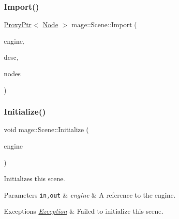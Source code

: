 \mbox{\label{classmage_1_1_scene_ac3ac7fd6eb1e6f59626b65f3da8553a4}} 
\subsubsection{\texorpdfstring{Import()}{Import()}\hspace{0.1cm}{\footnotesize\ttfamily [2/2]}}
{\footnotesize\ttfamily \mbox{\hyperlink{classmage_1_1_proxy_ptr}{Proxy\+Ptr}}$<$ \mbox{\hyperlink{classmage_1_1_node}{Node}} $>$ mage\+::\+Scene\+::\+Import (\begin{DoxyParamCaption}\item[{\mbox{\hyperlink{classmage_1_1_engine}{Engine}} \&}]{engine,  }\item[{const \mbox{\hyperlink{classmage_1_1rendering_1_1_model_descriptor}{rendering\+::\+Model\+Descriptor}} \&}]{desc,  }\item[{std\+::vector$<$ \mbox{\hyperlink{classmage_1_1_proxy_ptr}{Proxy\+Ptr}}$<$ \mbox{\hyperlink{classmage_1_1_node}{Node}} $>$ $>$ \&}]{nodes }\end{DoxyParamCaption})}

\mbox{\label{classmage_1_1_scene_a0edb77d5e45bd1822793d189a45fbb5c}} 
\subsubsection{\texorpdfstring{Initialize()}{Initialize()}}
{\footnotesize\ttfamily void mage\+::\+Scene\+::\+Initialize (\begin{DoxyParamCaption}\item[{\mbox{\hyperlink{classmage_1_1_engine}{Engine}} \&}]{engine }\end{DoxyParamCaption})}

Initializes this scene.


\begin{DoxyParams}[1]{Parameters}
\mbox{\tt in,out}  & {\em engine} & A reference to the engine. \\
\hline
\end{DoxyParams}

\begin{DoxyExceptions}{Exceptions}
{\em \mbox{\hyperlink{classmage_1_1_exception}{Exception}}} & Failed to initialize this scene. \\
\hline
\end{DoxyExceptions}
\mbox{\label{classmage_1_1_scene_a02ec2f7b43fd7050bc41eb7d89d4baba}} 

